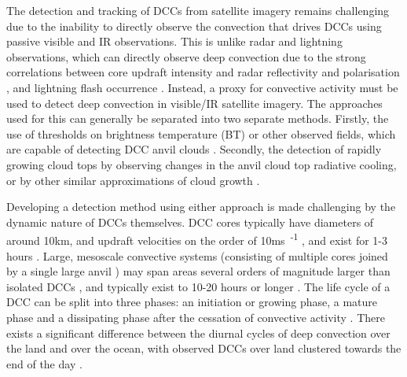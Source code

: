 \documentclass[amt, manuscript]{copernicus}
\begin{document}
The detection and tracking of DCCs from satellite imagery remains challenging due to the inability to directly observe the convection that drives DCCs using passive visible and IR observations.
This is unlike radar and lightning observations, which can directly observe deep convection due to the strong correlations between core updraft intensity and radar reflectivity and polarisation \citep{austin_relation_1987, rosenfeld_general_1993, zipser_vertical_1994},  and lightning flash occurrence \citep{williams_relationship_1989, deierling_total_2008, wang_relationship_2017}.
Instead, a proxy for convective activity must be used to detect deep convection in visible/IR satellite imagery.
The approaches used for this can generally be separated into two separate methods. 
Firstly, the use of thresholds on brightness temperature (BT) or other observed fields, which are capable of detecting DCC anvil clouds \citep[e.g.][]{schmetz_monitoring_1997, hong_detection_2005, schroder_deep_2009, liang_integrated_2017, senf_size-resolved_2018}.
Secondly, the detection of rapidly growing cloud tops by observing changes in the anvil cloud top radiative cooling, or by other similar approximations of cloud growth \citep{zinner_cb-tram:_2008, bedka_objective_2010, muller_novel_2019}.

Developing a detection method using either approach is made challenging by the dynamic nature of DCCs themselves.
DCC cores typically have diameters of around 10\unit{km}, and updraft velocities on the order of 10\unit{ms\textsuperscript{-1}} \citep{weisman_mesoscale_2015}, and exist for 1-3 hours \citep{chen_diurnal_1997}.
Large, mesoscale convective systems (consisting of multiple cores joined by a single large anvil \citep{roca_simple_2017}) may span areas several orders of magnitude larger than isolated DCCs \citep{houze_mesoscale_2004}, and typically exist to 10-20 hours or longer \citep{chen_diurnal_1997}.
The life cycle of a DCC can be split into three phases: an initiation or growing phase, a mature phase and a dissipating phase after the cessation of convective activity \citep{wall_life_2018}.
There exists a significant difference between the diurnal cycles of deep convection over the land and over the ocean, with observed DCCs over land clustered towards the end of the day \citep{taylor_evaluating_2017}.
\end{document}
